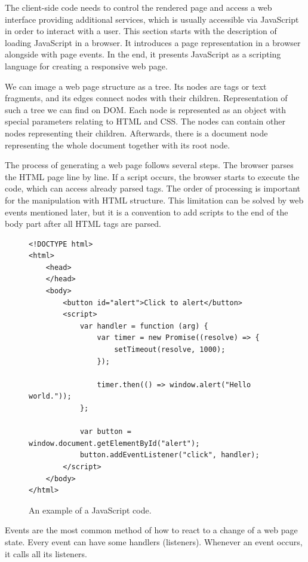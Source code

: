 The client-side code needs to control the rendered page and access a web interface providing additional services, which is usually accessible via JavaScript \cite{online:javascriptWiki} in order to interact with a user.
This section starts with the description of loading JavaScript in a browser.
It introduces a page representation in a browser alongside with page events.
In the end, it presents JavaScript as a scripting language for creating a responsive web page.
\par
We can image a web page structure as a tree.
Its nodes are tags or text fragments, and its edges connect nodes with their children.
Representation of such a tree we can find on \ac{DOM}.
Each node is represented as an object with special parameters relating to HTML and CSS. 
The nodes can contain other nodes representing their children.
Afterwards, there is a document node representing the whole document together with its root node.
\par
The process of generating a web page follows several steps.
The browser parses the HTML page line by line. If a script occurs, the browser starts to execute the code, which can access already parsed tags.
The order of processing is important for the manipulation with HTML structure.
This limitation can be solved by web events mentioned later, but
it is a convention to add scripts to the end of the body part after all HTML tags are parsed.
\par
\begin{figure}[b!]
\begin{lstlisting}
<!DOCTYPE html>
<html>
    <head>
    </head>
    <body>
        <button id="alert">Click to alert</button>
        <script>
            var handler = function (arg) {
                var timer = new Promise((resolve) => {
                    setTimeout(resolve, 1000);
                }); 
        
                timer.then(() => window.alert("Hello world."));
            };  

            var button = window.document.getElementById("alert");
            button.addEventListener("click", handler);
        </script>
    </body>
</html>
\end{lstlisting}
\caption{An example of a JavaScript code.}
\label{img02:javascript}
\end{figure}
\par
Events are the most common method of how to react to a change of a web page state.
Every event can have some handlers (listeners).
Whenever an event occurs, it calls all its listeners.
